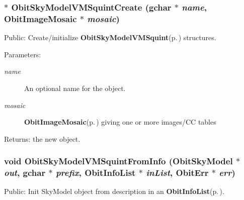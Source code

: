 \subsubsection{$\ast$ Obit\-Sky\-Model\-VMSquint\-Create (gchar $\ast$ {\em name}, {\bf Obit\-Image\-Mosaic} $\ast$ {\em mosaic})}\label{ObitSkyModelVMSquint_8h_a6}


Public: Create/initialize {\bf Obit\-Sky\-Model\-VMSquint}{\rm (p.\,\pageref{structObitSkyModelVMSquint})} structures. 

\begin{Desc}
\item[Parameters:]
\begin{description}
\item[{\em name}]An optional name for the object. \item[{\em mosaic}]{\bf Obit\-Image\-Mosaic}{\rm (p.\,\pageref{structObitImageMosaic})} giving one or more images/CC tables \end{description}
\end{Desc}
\begin{Desc}
\item[Returns:]the new object. \end{Desc}
\subsubsection{\setlength{\rightskip}{0pt plus 5cm}void Obit\-Sky\-Model\-VMSquint\-From\-Info ({\bf Obit\-Sky\-Model} $\ast$ {\em out}, gchar $\ast$ {\em prefix}, {\bf Obit\-Info\-List} $\ast$ {\em in\-List}, {\bf Obit\-Err} $\ast$ {\em err})}\label{ObitSkyModelVMSquint_8h_a5}


Public: Init Sky\-Model object from description in an {\bf Obit\-Info\-List}{\rm (p.\,\pageref{structObitInfoList})}. 

